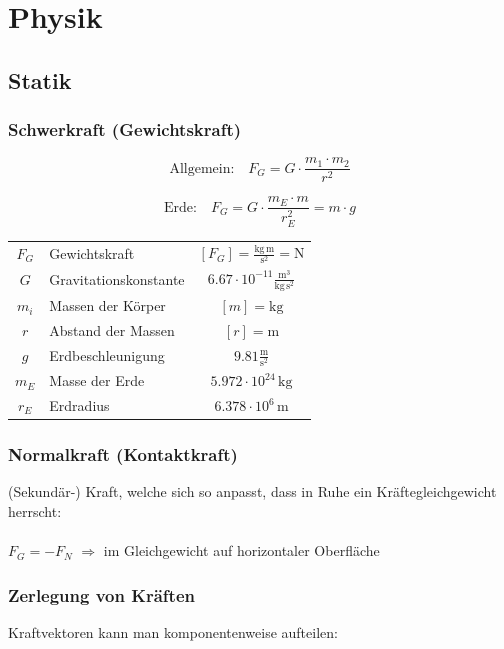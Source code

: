 \section{Physik}

	\subsection{Statik}
		
	\subsubsection{Schwerkraft (Gewichtskraft)}
	
	$$ \boxed{ \text{Allgemein:} \quad F_G = G \cdot \frac{m_1 \cdot m_2}{r^2} }$$
	
	$$ \boxed{ \text{Erde:} \quad  F_G = G \cdot \frac{m_E \cdot m}{r_E^2} = m \cdot g }$$ 

		
	\begin{tabular}{c l c}
	$F_G$ & Gewichtskraft & $[F_G] = \mathrm{\frac{kg \, m}{s^2} = N}$ \\
	$G$ & Gravitationskonstante & $6.67 \cdot 10^{-11} \mathrm{\frac{m^3}{kg \, s^2}}$ \\ 
	$m_i$ & Massen der Körper & $[m] = \mathrm{kg}$ \\
	$r$ & Abstand der Massen & $[r] =\mathrm{m}$ \\
	$g$ & Erdbeschleunigung & $9.81 \mathrm{\frac{m}{s^2}}$ \\
	$m_E$ & Masse der Erde & $5.972 \cdot 10^{24} \, \mathrm{kg} $ \\
	$r_E$ & Erdradius & $6.378 \cdot 10^6 \, \mathrm{m}$ \\
	\end{tabular}
		
	\subsubsection{Normalkraft (Kontaktkraft)}
	(Sekundär-) Kraft, welche sich so anpasst, dass in Ruhe ein Kräftegleichgewicht herrscht: \\
	\\
	$\boxed{ F_G = -F_N}$ \qquad $\Rightarrow$ im Gleichgewicht auf horizontaler Oberfläche
		
		
	\subsubsection{Zerlegung von Kräften}
	Kraftvektoren kann man komponentenweise aufteilen: \\
	\\
	
